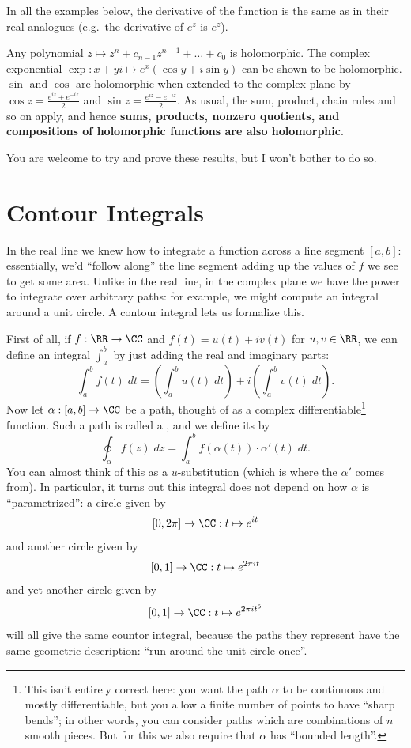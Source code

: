 \begin{example}
	In all the examples below, the derivative of the function
	is the same as in their real analogues
	(e.g.\ the derivative of $e^z$ is $e^z$).
	\begin{enumerate}[(a)]
		\ii Any polynomial $z \mapsto z^n + c_{n-1} z^{n-1} + \dots + c_0$ is holomorphic.
		\ii The complex exponential $\exp : x+yi \mapsto e^x (\cos y + i \sin y)$
		can be shown to be holomorphic.
		\ii $\sin$ and $\cos$ are holomorphic when extended
		to the complex plane by $\cos z = \frac{e^{iz}+e^{-iz}}{2}$
		and $\sin z = \frac{e^{iz}-e^{-iz}}{2}$.
		\ii As usual, the sum, product, chain rules and so on apply,
		and hence \textbf{sums, products, nonzero quotients,
		and compositions of holomorphic functions are also holomorphic}.
	\end{enumerate}
\end{example}
You are welcome to try and prove these results, but I won't bother to do so.

\section{Contour Integrals}
In the real line we knew how to integrate a function across a line segment $[a,b]$:
essentially, we'd ``follow along'' the line segment adding up the values of $f$ we see
to get some area.
Unlike in the real line, in the complex plane we have the power to integrate
over arbitrary paths: for example, we might compute an integral around a unit circle.
A contour integral lets us formalize this.

First of all, if $f : \RR \to \CC$ and $f(t) = u(t) + iv(t)$ for $u,v \in \RR$,
we can define an integral $\int_a^b$ by just adding the real and imaginary parts:
\[ \int_a^b f(t) \; dt
	= \left( \int_a^b u(t) \; dt \right)
	+ i \left( \int_a^b v(t) \; dt \right). \]
Now let $\alpha : [a,b] \to \CC$ be a path, thought of as
a complex differentiable\footnote{This isn't entirely correct here:
	you want the path $\alpha$ to be continuous and mostly differentiable,
	but you allow a finite number of points to have ``sharp bends''; in other words,
	you can consider paths which are combinations of $n$ smooth pieces.
	But for this we also require that $\alpha$ has ``bounded length''.} function.
Such a path is called a ,
and we define its  by
\[
	\oint_\alpha f(z) \; dz
	= \int_a^b f(\alpha(t)) \cdot \alpha'(t) \; dt.
\]
You can almost think of this as a $u$-substitution (which is where the $\alpha'$ comes from).
In particular, it turns out this integral does not depend on how $\alpha$ is ``parametrized'':
a circle given by \[ [0,2\pi] \to \CC : t \mapsto e^{it} \]
and another circle given by \[ [0,1] \to \CC : t \mapsto e^{2\pi i t} \]
and yet another circle given by \[ [0,1] \to \CC : t \mapsto e^{2 \pi i t^5} \]
will all give the same countor integral, because the paths they represent have the same
geometric description: ``run around the unit circle once''.

